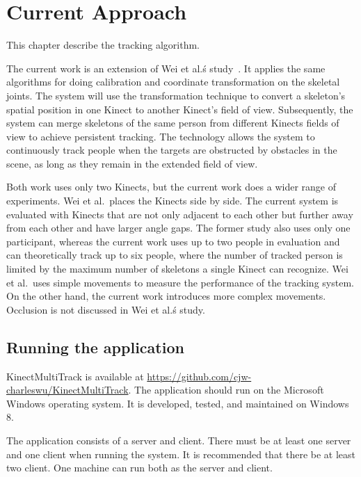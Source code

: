 


\chapter{Current Approach}

\label{chapter:current_approach}

This chapter describe the tracking algorithm.

The current work is an extension of Wei et al.\'s study~\cite{wei_kinect_calibration}. It applies the same algorithms for doing calibration and coordinate transformation on the skeletal joints. The system will use the transformation technique to convert a skeleton's spatial position in one Kinect to another Kinect's field of view. Subsequently, the system can merge skeletons of the same person from different Kinects fields of view to achieve persistent tracking. The technology allows the system to continuously track people when the targets are obstructed by obstacles in the scene, as long as they remain in the extended field of view. 

Both work uses only two Kinects, but the current work does a wider range of experiments. Wei et al.\ places the Kinects side by side. The current system is evaluated with Kinects that are not only adjacent to each other but further away from each other and have larger angle gaps. The former study also uses only one participant, whereas the current work uses up to two people in evaluation and can theoretically track up to six people, where the number of tracked person is limited by the maximum number of skeletons a single Kinect can recognize. Wei et al.\ uses simple movements to measure the performance of the tracking system. On the other hand, the current work introduces more complex movements. Occlusion is not discussed in Wei et al.\'s study.

\section{Running the application}
\label{sec:current_approach_running_application}

KinectMultiTrack is available at \url{https://github.com/cjw-charleswu/KinectMultiTrack}. The application should run on the Microsoft Windows operating system. It is developed, tested, and maintained on Windows 8.

The application consists of a server and client. There must be at least one server and one client when running the system. It is recommended that there be at least two client. One machine can run both as the server and client.

